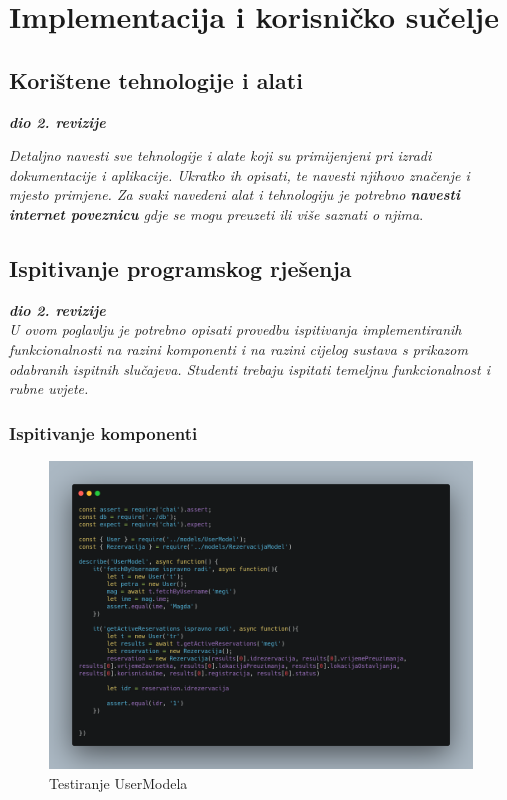 \chapter{Implementacija i korisničko sučelje}
		
		
		\section{Korištene tehnologije i alati}
		
			\textbf{\textit{dio 2. revizije}}
			
			 \textit{Detaljno navesti sve tehnologije i alate koji su primijenjeni pri izradi dokumentacije i aplikacije. Ukratko ih opisati, te navesti njihovo značenje i mjesto primjene. Za svaki navedeni alat i tehnologiju je potrebno \textbf{navesti internet poveznicu} gdje se mogu preuzeti ili više saznati o njima}.
			
			
			\eject 
		
	
		\section{Ispitivanje programskog rješenja}
			
			\textbf{\textit{dio 2. revizije}}\\
			
			 \textit{U ovom poglavlju je potrebno opisati provedbu ispitivanja implementiranih funkcionalnosti na razini komponenti i na razini cijelog sustava s prikazom odabranih ispitnih slučajeva. Studenti trebaju ispitati temeljnu funkcionalnost i rubne uvjete.}
	
			
			\subsection{Ispitivanje komponenti}
			
			\begin{figure}[hp]
                    \centering
                    \includegraphics[width=15cm]{slike/UserModel.png}
                    \caption{Testiranje UserModela}
                    \label{fig:useCase-2}
                \end{figure}
			\eject 
			
